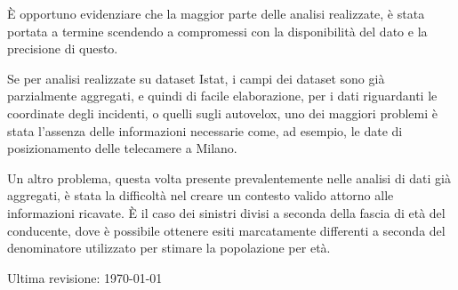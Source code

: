 \documentclass[a4paper]{article}
\begin{document}
\`E opportuno evidenziare che la maggior parte delle analisi realizzate, 
è stata portata a termine scendendo a compromessi con la disponibilità del dato e la 
precisione di questo. 


Se per analisi realizzate su dataset Istat, i campi dei dataset sono già 
parzialmente aggregati, e quindi di facile elaborazione, 
per i dati riguardanti le coordinate degli incidenti, 
o quelli sugli autovelox, uno dei maggiori problemi è stata l'assenza delle 
informazioni necessarie come, ad esempio, le date di 
posizionamento delle telecamere a Milano. 


Un altro problema, questa volta presente prevalentemente nelle analisi di dati già aggregati, 
è stata la difficoltà nel creare un contesto valido attorno alle informazioni ricavate. 
\`E il caso dei sinistri divisi a seconda della fascia di età del conducente, dove è possibile 
ottenere esiti marcatamente differenti a seconda del denominatore utilizzato per 
stimare la popolazione per età.

\raggedleft\vfill\scriptsize Ultima revisione: \today\par
\end{document}
